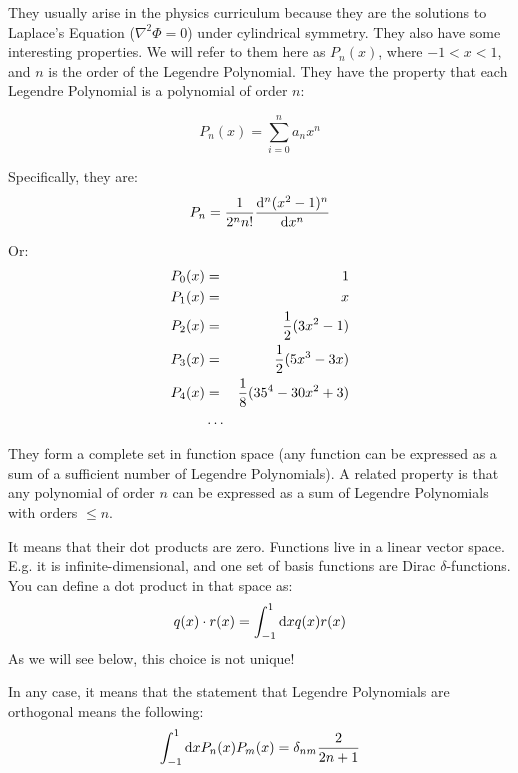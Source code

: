 \begin{answer}
  They usually arise in the physics curriculum because they are the
  solutions to Laplace's Equation ($\nabla^2 \Phi =0$) under
  cylindrical symmetry. They also have some interesting properties. We
  will refer to them here as $P_n(x)$, where $-1 < x < 1$, and $n$ is
  the order of the Legendre Polynomial. They have the property that
  each Legendre Polynomial is a polynomial of order $n$:

  \begin{equation}
    P_n(x) = \sum_{i=0}^n a_n x^n 
  \end{equation}

  Specifically, they are:
  \begin{equation}
    P_n = \frac{1}{2^n n!} \frac{{\rm d}^n(x^2 -1)^n}{{\rm d} x^n}
  \end{equation}

  Or:
  \begin{eqnarray}
    P_0(x) &=& 1 \cr
    P_1(x) &=& x \cr
    P_2(x) &=& \frac{1}{2}(3x^2 -1) \cr
    P_3(x) &=& \frac{1}{2}(5x^3 - 3x) \cr
    P_4(x) &=& \frac{1}{8}(35^4 - 30x^2 + 3) \cr
    &\ldots& 
  \end{eqnarray}

  They form a complete set in function space (any function can be
  expressed as a sum of a sufficient number of Legendre Polynomials).
  A related property is that any polynomial of order $n$ can be
  expressed as a sum of Legendre Polynomials with orders $\le n$.
\end{answer}


\begin{answer}
  It means that their dot products are zero. Functions live in a linear
  vector space. E.g. it is infinite-dimensional, and one set of basis
  functions are Dirac $\delta$-functions. You can define a dot product
  in that space as:
  \begin{equation}
    q(x) \cdot r(x) = \int_{-1}^{1} {\rm d}x q(x) r(x)
  \end{equation}
  As we will see below, this choice is not unique!

  In any case, it means that the statement that Legendre Polynomials
  are orthogonal means the following:
  \begin{equation}
    \int_{-1}^{1} {\rm d}x P_n(x) P_m(x) = \delta_{nm}
    \frac{2}{2n+1}
  \end{equation}
\end{answer}

